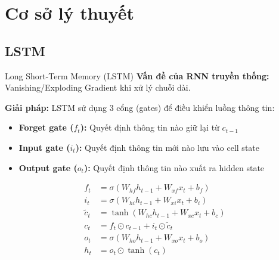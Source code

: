 \documentclass[serif, aspectratio=169]{beamer}
\begin{document}
\section{Cơ sở lý thuyết}

\subsection{LSTM}
\begin{frame}{Long Short-Term Memory (LSTM)}
\footnotesize
\textbf{Vấn đề của RNN truyền thống:} Vanishing/Exploding Gradient khi xử lý chuỗi dài.

\vspace{0.3cm}
\textbf{Giải pháp:} LSTM sử dụng 3 cổng (gates) để điều khiển luồng thông tin:
\begin{itemize}
    \item \textbf{Forget gate ($f_t$):} Quyết định thông tin nào giữ lại từ $c_{t-1}$
    \item \textbf{Input gate ($i_t$):} Quyết định thông tin mới nào lưu vào cell state
    \item \textbf{Output gate ($o_t$):} Quyết định thông tin nào xuất ra hidden state
\end{itemize}
\vspace{0.3cm}
\begin{align*}
f_t &= \sigma(W_{hf} h_{t-1} + W_{xf} x_t + b_f) \\
i_t &= \sigma(W_{hi} h_{t-1} + W_{xi} x_t + b_i) \\
\tilde{c}_t &= \tanh(W_{hc} h_{t-1} + W_{xc} x_t + b_c) \\
c_t &= f_t \odot c_{t-1} + i_t \odot \tilde{c}_t \\
o_t &= \sigma(W_{ho} h_{t-1} + W_{xo} x_t + b_o) \\
h_t &= o_t \odot \tanh(c_t)
\end{align*}
\end{frame}
\end{document}
